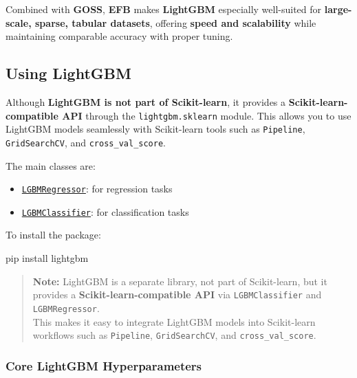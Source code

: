 \documentclass[
  letterpaper,
  DIV=11,
  numbers=noendperiod]{scrreprt}
\newenvironment{Shaded}{\begin{snugshade}}{\end{snugshade}}
\newcommand{\NormalTok}[1]{\textcolor[rgb]{0.00,0.23,0.31}{#1}}
\providecommand{\tightlist}{%
  \setlength{\itemsep}{0pt}\setlength{\parskip}{0pt}}\usepackage{longtable,booktabs,array}
\begin{document}
Combined with \textbf{GOSS}, \textbf{EFB} makes \textbf{LightGBM}
especially well-suited for \textbf{large-scale, sparse, tabular
datasets}, offering \textbf{speed and scalability} while maintaining
comparable accuracy with proper tuning.

\subsection{Using LightGBM}\label{using-lightgbm}

Although \textbf{LightGBM is not part of Scikit-learn}, it provides a
\textbf{Scikit-learn-compatible API} through the
\texttt{lightgbm.sklearn} module. This allows you to use LightGBM models
seamlessly with Scikit-learn tools such as \texttt{Pipeline},
\texttt{GridSearchCV}, and \texttt{cross\_val\_score}.

The main classes are:

\begin{itemize}
\tightlist
\item
  \href{https://lightgbm.readthedocs.io/en/latest/pythonapi/lightgbm.LGBMRegressor.html}{\texttt{LGBMRegressor}}:
  for regression tasks\\
\item
  \href{https://lightgbm.readthedocs.io/en/latest/pythonapi/lightgbm.LGBMClassifier.html}{\texttt{LGBMClassifier}}:
  for classification tasks
\end{itemize}

To install the package:

\begin{Shaded}
\begin{Highlighting}[]
\NormalTok{pip install lightgbm}
\end{Highlighting}
\end{Shaded}

\begin{quote}
\textbf{Note:} LightGBM is a separate library, not part of Scikit-learn,
but it provides a \textbf{Scikit-learn-compatible API} via
\texttt{LGBMClassifier} and \texttt{LGBMRegressor}.\\
This makes it easy to integrate LightGBM models into Scikit-learn
workflows such as \texttt{Pipeline}, \texttt{GridSearchCV}, and
\texttt{cross\_val\_score}.
\end{quote}

\subsubsection{Core LightGBM
Hyperparameters}\label{core-lightgbm-hyperparameters}
\end{document}
